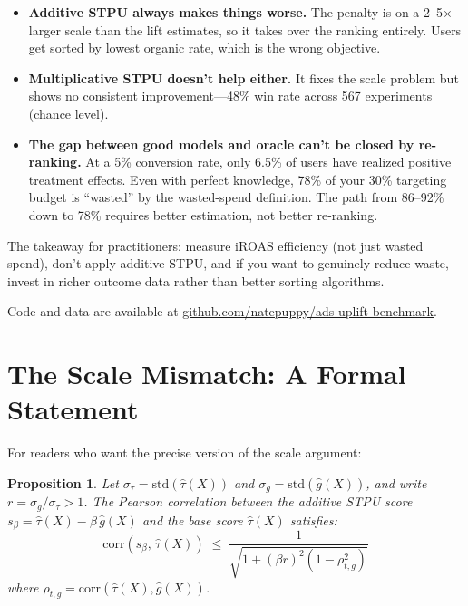 \documentclass[10pt]{article}
\newtheorem{proposition}{Proposition}
\newcommand{\ghat}{\hat{g}(X)}
\newcommand{\tauhat}{\hat{\tau}(X)}
\begin{document}
\begin{itemize}[topsep=2pt,itemsep=2pt]
  \item \textbf{Additive STPU always makes things worse.}
    The penalty is on a 2--5$\times$ larger scale than the lift estimates,
    so it takes over the ranking entirely.  Users get sorted by lowest
    organic rate, which is the wrong objective.

  \item \textbf{Multiplicative STPU doesn't help either.}
    It fixes the scale problem but shows no consistent improvement---48\%
    win rate across 567 experiments (chance level).

  \item \textbf{The gap between good models and oracle can't be closed
    by re-ranking.}
    At a 5\% conversion rate, only 6.5\% of users have realized positive
    treatment effects.  Even with perfect knowledge, 78\% of your 30\%
    targeting budget is ``wasted'' by the wasted-spend definition.  The
    path from 86--92\% down to 78\% requires better estimation, not
    better re-ranking.
\end{itemize}

The takeaway for practitioners: measure iROAS efficiency (not just wasted
spend), don't apply additive STPU, and if you want to genuinely reduce waste,
invest in richer outcome data rather than better sorting algorithms.

Code and data are available at
\href{https://github.com/natepuppy/ads-uplift-benchmark}{github.com/natepuppy/ads-uplift-benchmark}.




\appendix
\section{The Scale Mismatch: A Formal Statement}
\label{app:scale}

For readers who want the precise version of the scale argument:

\begin{proposition}
Let $\sigma_\tau = \mathrm{std}(\tauhat)$ and $\sigma_g = \mathrm{std}(\ghat)$,
and write $r = \sigma_g / \sigma_\tau > 1$.
The Pearson correlation between the additive STPU score
$s_\beta = \tauhat - \beta\,\ghat$ and the base score $\tauhat$ satisfies:
\begin{equation}
  \mathrm{corr}(s_\beta,\, \tauhat) \;\leq\;
    \frac{1}{\sqrt{1 + (\beta r)^2 (1 - \rho_{t,g}^2)}}
\end{equation}
where $\rho_{t,g} = \mathrm{corr}(\tauhat, \ghat)$.
\end{proposition}
\end{document}
